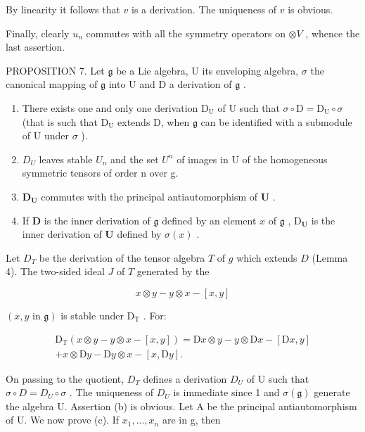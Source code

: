 By linearity it follows that \(v\) is a derivation. The uniqueness of \(v\) is obvious.

Finally, clearly \(u_{n}\) commutes with all the symmetry operators on \(\otimes V\) , whence the last assertion.

PROPOSITION 7. Let \(\mathfrak{g}\) be a Lie algebra, U its enveloping algebra, \(\sigma\) the canonical mapping of \(\mathfrak{g}\) into U and D a derivation of \(\mathfrak{g}\) .

\begin{enumerate}
\def\labelenumi{(\alph{enumi})}
\item
  There exists one and only one derivation \(\mathrm{D_U}\) of U such that \(\sigma \circ \mathrm{D} = \mathrm{D_U} \circ \sigma\) (that is such that \(\mathrm{D_U}\) extends D, when \(\mathfrak{g}\) can be identified with a submodule of U under \(\sigma\) ).
\item
  \(D_{U}\) leaves stable \(U_{n}\) and the set \(U^{n}\) of images in U of the homogeneous symmetric tensors of order n over g.
\item
  \(\mathbf{D}_{\mathbf{U}}\) commutes with the principal antiautomorphism of \(\mathbf{U}\) .
\item
  If \(\mathbf{D}\) is the inner derivation of \(\mathfrak{g}\) defined by an element \(x\) of \(\mathfrak{g}\) , \(\mathrm{D}_{\mathbf{U}}\) is the inner derivation of \(\mathbf{U}\) defined by \(\sigma(x)\) .
\end{enumerate}

Let \(D_T\) be the derivation of the tensor algebra \(T\) of \(g\) which extends \(D\) (Lemma 4). The two-sided ideal \(J\) of \(T\) generated by the

\[
x \otimes y - y \otimes x - [ x, y ]
\]

\((x,y \text{ in } \mathfrak{g})\) is stable under \(\mathrm{D}_{\mathrm{T}}\) . For:

\[
\begin{array}{r} \mathrm{D} _ {\mathrm{T}} (x \otimes y - y \otimes x - [ x, y ]) = \mathrm{D} x \otimes y - y \otimes \mathrm{D} x - [ \mathrm{D} x, y ] \\ + x \otimes \mathrm{D} y - \mathrm{D} y \otimes x - [ x, \mathrm{D} y ]. \end{array}
\]

On passing to the quotient, \(D_{T}\) defines a derivation \(D_{U}\) of U such that \(\sigma \circ D = D_{U} \circ \sigma\) . The uniqueness of \(D_{U}\) is immediate since 1 and \(\sigma(\mathfrak{g})\) generate the algebra U. Assertion (b) is obvious. Let A be the principal antiautomorphism of U. We now prove (c). If \(x_{1}, \ldots, x_{n}\) are in g, then

